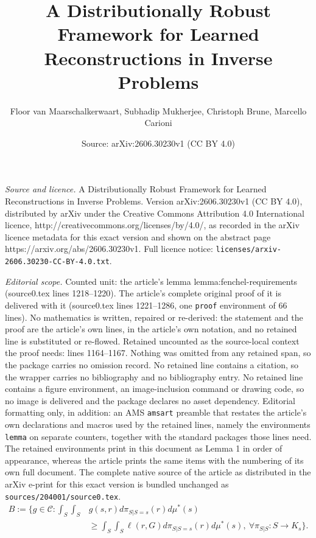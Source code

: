 \documentclass[10pt,a4paper]{amsart}
\title{A Distributionally Robust Framework for Learned Reconstructions in Inverse Problems}
\author{Floor van Maarschalkerwaart, Subhadip Mukherjee, Christoph Brune, Marcello Carioni}
\date{Source: arXiv:2606.30230v1 (CC BY 4.0)}
\newcommand{\C}{\mathcal{C}} %
\begin{document}
\maketitle

\noindent\emph{Source and licence.} A Distributionally Robust Framework for Learned Reconstructions in Inverse Problems. Version arXiv:2606.30230v1 (CC BY 4.0), distributed by arXiv under the Creative Commons Attribution 4.0 International licence, http://creativecommons.org/licenses/by/4.0/, as recorded in the arXiv licence metadata for this exact version and shown on the abstract page https://arxiv.org/abs/2606.30230v1. Full licence notice: \texttt{licenses/arxiv-2606.30230-CC-BY-4.0.txt}.\par\smallskip

\noindent\textit{Editorial scope.} Counted unit: the article's lemma lemma:fenchel-requirements (source0.tex lines 1218--1220). The article's complete original proof of it is delivered with it (source0.tex lines 1221--1286, one \texttt{proof} environment of 66 lines). No mathematics is written, repaired or re-derived: the statement and the proof are the article's own lines, in the article's own notation, and no retained line is substituted or re-flowed.  Retained uncounted as the source-local context the proof needs: lines 1164--1167.  Nothing was omitted from any retained span, so the package carries no omission record.  No retained line contains a citation, so the wrapper carries no bibliography and no bibliography entry.  No retained line contains a figure environment, an image-inclusion command or drawing code, so no image is delivered and the package declares no asset dependency.  Editorial formatting only, in addition: an AMS \texttt{amsart} preamble that restates the article's own declarations and macros used by the retained lines, namely the environments \texttt{lemma} on separate counters, together with the standard packages those lines need.  The retained environments print in this document as Lemma 1 in order of appearance, whereas the article prints the same items with the numbering of its own full document.  The complete native source of the article as distributed in the arXiv e-print for this exact version is bundled unchanged as \texttt{sources/204001/source0.tex}.
\begin{align}\label{eq:B}
    B:= \bigg\{ g \in \C: \int_S\int_S &g(s,r)d\pi_{S|S=s}(r)d\mu^*(s) \\
    &\geq \int_S\int_S\ell(r,G) d\pi_{S|S=s}(r) d\mu^*(s), \ \forall \pi_{S|S}: S\rightarrow K_s \bigg\}\nonumber.
\end{align}
\end{document}
